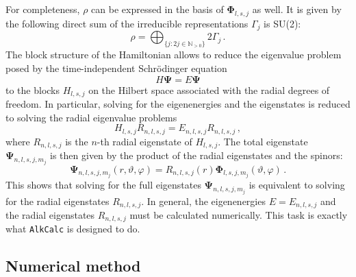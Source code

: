 \documentclass[fontsize=12pt,
               twoside=false,
               BCOR=0mm,
               DIV=14,
               overfullrule=false, %
               toc=bibliography,
               headinclude=true,
               footinclude=false]{scrartcl}
\numberwithin{equation}{section}
\newcommand{\alkcalc}{\texttt{AlkCalc} }
\begin{document}
    For completeness, $\rho$ can be expressed in the basis of
    $\bm{\Phi}_{l,s,j}$ as well. It is given by the following direct sum of the
    irreducible representations $\Gamma_j$ is SU(2):
    \begin{equation}
        \rho
        =
        \bigoplus_{\{j\colon 2j\in\mathbb{N}_{>0}\}}
        2\Gamma_j
    \,.
    \end{equation}
    The block structure of the Hamiltonian allows to reduce the eigenvalue
    problem posed by the time-independent Schr\"odinger equation
    \begin{equation}
        H \bm{\Psi} = E \bm{\Psi}
    \end{equation}
    to the blocks $H_{l,s,j}$ on the Hilbert space associated with the radial
    degrees of freedom. In particular, solving for the eigenenergies and
    the eigenstates is reduced to solving the radial eigenvalue problems
    \begin{equation}\label{eq:RadialEigenvalueProblem}
        H_{l,s,j} R_{n,l,s,j} = E_{n,l,s,j} R_{n,l,s,j}
    \,,
    \end{equation}
    where $R_{n,l,s,j}$ is the $n$-th radial eigenstate of $H_{l,s,j}$. The
    total eigenstate $\bm{\Psi}_{n,l,s,j,m_j}$ is then given by the product of
    the radial eigenstates and the spinors:
    \begin{equation}\label{eq:TotalEigenstate}
        \bm{\Psi}_{n,l,s,j,m_j}(r,\vartheta,\varphi)
        =
        R_{n,l,s,j}(r)
        \bm{\Phi}_{l,s,j,m_j}(\vartheta,\varphi)
    \,.
    \end{equation}
    This shows that solving for the full eigenstates $\bm{\Psi}_{n,l,s,j,m_j}$
    is equivalent to solving for the radial eigenstates $R_{n,l,s,j}$.  In
    general, the eigenenergies $E=E_{n,l,s,j}$ and the radial eigenstates
    $R_{n,l,s,j}$ must be calculated numerically. This task is exactly what
    \alkcalc is designed to do.

    \subsection{Numerical method}
    \label{subsec:NumericalMethod}
\end{document}
